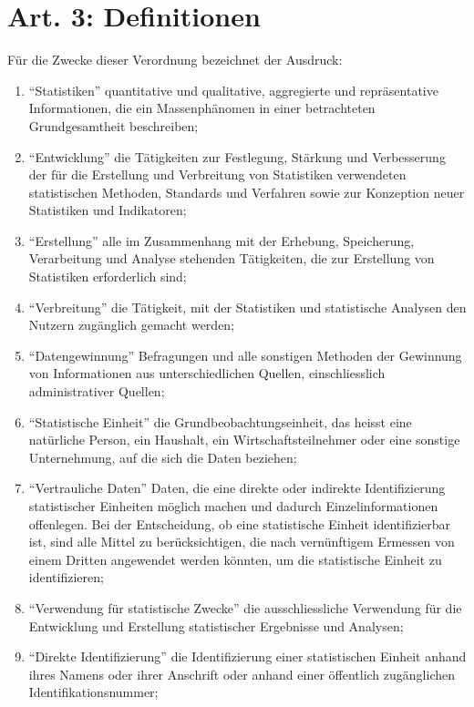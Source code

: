 \documentclass[A4, 12pt]{scrbook}
\begin{document}
    \section{Art. 3: Definitionen}
        Für die Zwecke dieser Verordnung bezeichnet der Ausdruck:
        \begin{enumerate}
            \item ``Statistiken'' quantitative und qualitative, aggregierte und repräsentative Informationen, die ein Massenphänomen in einer betrachteten Grundgesamtheit beschreiben;
            \item ``Entwicklung'' die Tätigkeiten zur Festlegung, Stärkung und Verbesserung der für die Erstellung und Verbreitung von Statistiken verwendeten statistischen Methoden, Standards und Verfahren sowie zur Konzeption neuer Statistiken und Indikatoren;
            \item ``Erstellung'' alle im Zusammenhang mit der Erhebung, Speicherung, Verarbeitung und Analyse stehenden Tätigkeiten, die zur Erstellung von Statistiken erforderlich sind;
            \item ``Verbreitung'' die Tätigkeit, mit der Statistiken und statistische Analysen den Nutzern zugänglich gemacht werden;
            \item ``Datengewinnung'' Befragungen und alle sonstigen Methoden der Gewinnung von Informationen aus unterschiedlichen Quellen, einschliesslich administrativer Quellen;
            \item ``Statistische Einheit'' die Grundbeobachtungseinheit, das heisst eine natürliche Person, ein Haushalt, ein Wirtschaftsteilnehmer oder eine sonstige Unternehmung, auf die sich die Daten beziehen;
            \item ``Vertrauliche Daten'' Daten, die eine direkte oder indirekte Identifizierung statistischer Einheiten möglich machen und dadurch Einzelinformationen offenlegen. Bei der Entscheidung, ob eine statistische Einheit identifizierbar ist, sind alle Mittel zu berücksichtigen, die nach vernünftigem Ermessen von einem Dritten angewendet werden könnten, um die statistische Einheit zu identifizieren;
            \item ``Verwendung für statistische Zwecke'' die ausschliessliche Verwendung für die Entwicklung und Erstellung statistischer Ergebnisse und Analysen;
            \item ``Direkte Identifizierung'' die Identifizierung einer statistischen Einheit anhand ihres Namens oder ihrer Anschrift oder anhand einer öffentlich zugänglichen Identifikationsnummer;

\end{enumerate}
\end{document}
